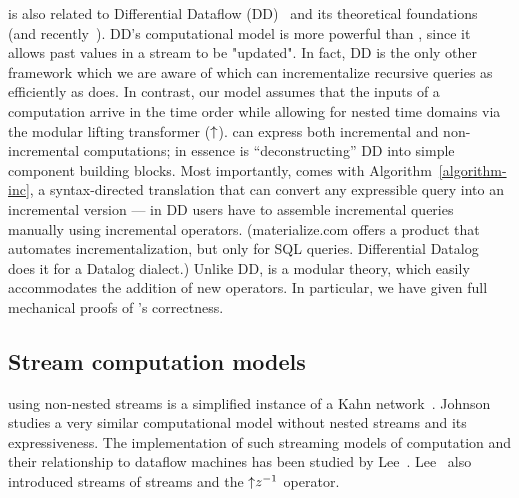 \begin{comment}
The main problem that change structures address is that the types used in programs are not
closed under subtraction (e.g., the delta between two sets is not a set).
Although a relational \dbsp circuit computes
only on positive \zr values, its incremental version may compute on negative
values, but the equivalence of the two programs guarantees correctness even though the
type system of \zrs does not.  \val{Safe to delete this para}
\end{comment}


\dbsp is also related to Differential Dataflow
(DD)~\cite{mcsherry-cidr13, murray-sosp13} and its theoretical
foundations~\cite{abadi-fossacs15} (and
recently~\cite{mchserry-vldb20,chothia-vldb16}).  DD's computational
model is more powerful than \dbsp, since it allows past values in a
stream to be "updated".  In fact, DD is the only other framework which
we are aware of which can incrementalize recursive queries as
efficiently as \dbsp does.  In contrast, our model assumes that the
inputs of a computation arrive in the time order while allowing for
nested time domains via the modular lifting transformer (${\uparrow}$).
\dbsp can express both incremental and non-incremental computations;
in essence \dbsp is ``deconstructing'' DD into simple component
building blocks.  Most importantly, \dbsp comes with
Algorithm~\ref{algorithm-inc}, a syntax-directed translation that can
convert any expressible query into an incremental version --- in DD
users have to assemble incremental queries manually using incremental
operators.  (materialize.com offers a product that automates
incrementalization, but only for SQL queries.  Differential
Datalog~\cite{ryzhyk-datalog19} does it for a Datalog dialect.)
Unlike DD, \dbsp is a modular theory, which easily accommodates the
addition of new operators.  In particular, we have given full
mechanical proofs of \dbsp's correctness.

\subsection{Stream computation models}

\dbsp using non-nested streams is a simplified instance of a Kahn
network~\cite{kahn-ifip74}.  Johnson~\cite{johnson-phd83} studies a
very similar computational model without nested streams and its
expressiveness. The implementation of such streaming models of
computation and their relationship to dataflow machines has been
studied by Lee~\cite{lee-ieee95}.  Lee~\cite{lee-ifip93} also
introduced streams of streams and the ${\uparrow}z^{-1}$ operator.

